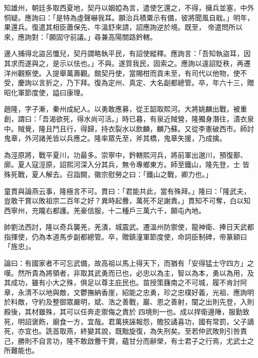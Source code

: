 \begin{pinyinscope}
 知雄州，朝廷多取西夏地，契丹以姻婭為言，遣使乞還之，不得，擁兵並塞，中外恫疑。應詢曰：「是特為虛聲嚇我耳。願治兵積粟示有備，彼將聞風自戢。」明年，果還兵。復遣其相臣蕭保先、牛溫舒來請，詔應詢逆於境。既至，
 帝遣問所以來，應詢對：「願固守前議。」尋兼高陽關路鈐轄。



 邊人捕得北盜呂懺兒，契丹謂略執平民，有詔使縱釋。應詢言：「吾知執盜耳，因其求而遂與之，是示以怯也。」不與。遂質我民，固索之。應詢以違詔貶秩，再遷洋州觀察使。入提舉萬壽觀。館契丹使，當賜柑而貢未至，有司代以他物，使不受，慶詢以言折之，乃下拜。復為定州、真定、大名副都總管。卒，年六十三，贈昭化軍節度使，謚曰康理。



 趙隆，字子漸，秦州成紀人。以勇敢應募，從王韶取熙河。大將姚麟出戰，被重創，謂曰：「吾渴欲死，得水尚可活。」時已暮，有泉近賊營，隆獨身潛往，漬衣泉中。賊覺，隆且鬥且行，得歸，持衣裂水以飲麟，麟乃蘇。又從李憲破西市。師討鬼章，外河諸羌皆以兵應之。隆率眾先至，斧其橋，鬼章失援，乃成擒。



 為涇原將，戰平夏川，功最多。崇寧中，鈐轄熙河兵，將前軍出邈川，預復鄯、廓。夏人寇涇原，詔熙河深入分其兵，無令專鄉東方。師至鐵山，隆先登，士
 皆殊死戰，夏人解去。召詣闕，徽宗慰勞之曰：「鐵山之戰，卿力也。」



 童貫與論燕云事，隆極言不可。貫曰：「君能共此，當有殊拜。」隆曰：「隆武夫，豈敢干賞以敗祖宗二百年之好？異時起釁，萬死不足謝責。」貫知不可奪，白以知西寧州，充隴右都護。羌豪信服，十二種戶三萬六千，願屯內地。



 帥劉法西討，隆以奇兵襲羌，羌潰，城震武。遷溫州防禦使，龍神衛、捧日天武都指揮使，仍為本道馬步副都總管。卒，贈鎮潼軍節度使，命詞臣制碑，帝篆額曰「旌忠」。



 論曰：有國家者不可忘武備，故高祖以馬上得天下，而猶有「安得猛士守四方」之嘆。然所貴為將領者，非取其武勇而已也，必忠以為主，智以為本，勇以為用，及其成功，雖有小大之殊，俱足以尊主庇民也。苗授策籛南之不可城，履不肯討阿章，永清不以地與敵，文鬱撫納香崖，紹能之忠勇，珍之忠樸好義，光祖、應詢明於料敵，守約及整御眾嚴明，斌、浩之善戰，巖、恩之善射，闃之出則先登，入則殿後，其材雖殊，其可以任奔走禦侮之責於
 四境則一也。成以捍衛邊陲，服勤致死，明詔褒飭，廟食一方，宜哉。君萬挾誣報怨，贍狡譎喜功，國有常罰，父子謫死，亦宜也。詵首取燕，終變其說，既黜旋復，為失刑矣。至若仲武敗則引咎責己，勝則不自言功，隆不敢啟釁干賞，蘊甘分而辭榮，有士君子之行焉，尤武士之所難能也。



\end{pinyinscope}